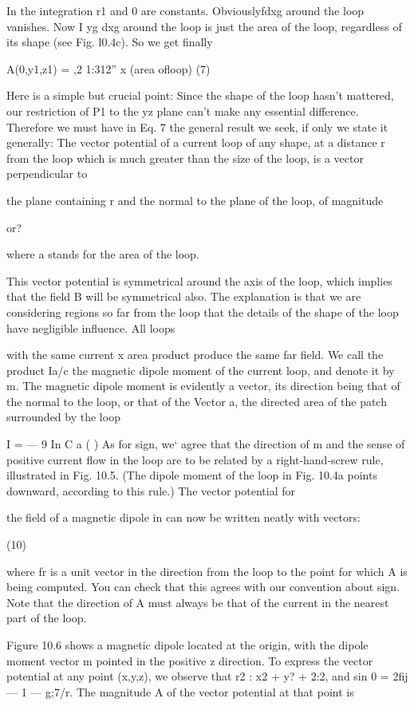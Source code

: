 {In the integration r1 and 0 are constants. Obviouslyfdxg around
the loop vanishes. Now I yg dxg around the loop is just the area
of the loop, regardless of its shape (see Fig. l0.4c). So we get finally

A(0,y1,z1) = ,2 1:312'' x (area ofloop) (7)

Here is a simple but crucial point: Since the shape of the loop
hasn't mattered, our restriction of P1 to the yz plane can't make any
essential difference. Therefore we must have in Eq. 7 the general
result we seek, if only we state it generally: The vector potential of
a current loop of any shape, at a distance r from the loop which is
much greater than the size of the loop, is a vector perpendicular to

the plane containing r and the normal to the plane of the loop, of
magnitude

or?

where a stands for the area of the loop.

This vector potential is symmetrical around the axis of the loop,
which implies that the field B will be symmetrical also. The explanation
is that we are considering regions so far from the loop that the
details of the shape of the loop have negligible influence. All loops

 

with the same current x area product produce the same far field.
We call the product Ia/c the magnetic dipole moment of the current
loop, and denote it by m. The magnetic dipole moment is evidently
a vector, its direction being that of the normal to the loop, or that
of the Vector a, the directed area of the patch surrounded by the loop

I
=  ---  9
In C a ( )
As for sign, we‘ agree that the direction of m and the sense of positive
current flow in the loop are to be related by a right-hand-screw rule,
illustrated in Fig. 10.5. (The dipole moment of the loop in Fig. 10.4a
points downward, according to this rule.) The vector potential for

the field of a magnetic dipole in can now be written neatly with
vectors:

(10)

where fr is a unit vector in the direction from the loop to the point for
which A is being computed. You can check that this agrees with
our convention about sign. Note that the direction of A must always
be that of the current in the nearest part of the loop.

Figure 10.6 shows a magnetic dipole located at the origin, with the
dipole moment vector m pointed in the positive z direction. To express
the vector potential at any point (x,y,z), we observe that
r2 : x2 + y? + 2:2, and sin 0 = \/2fij --- 1 --- g;7/r. The magnitude A of
the vector potential at that point is

}
